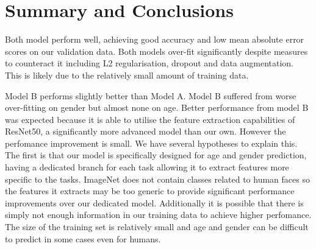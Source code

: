 \section{Summary and Conclusions}
Both model perform well, achieving good accuracy and low mean absolute error scores on our validation data.
Both models over-fit significantly despite measures to counteract it including L2 regularisation,
dropout and data augmentation. This is likely due to the relatively small amount of training data.

Model B performs slightly better than Model A. Model B suffered from worse over-fitting on gender but almost none on age. Better performance from model B was expected because it is able to utilise the feature extraction capabilities of ResNet50, a significantly more advanced model than our own. However the perfomance improvement is small. We have several hypotheses to explain this. The first is that our model is specifically designed for age and gender prediction, having a dedicated branch for each task allowing it to extract features more specific to the tasks. ImageNet does not contain classes related to human faces so the features it extracts may be too generic to provide significant performance improvements over our dedicated model. Additionally it is possible that there is simply not enough information in our training data to achieve higher perfomance. The size of the training set is relatively small and age and gender can be difficult to predict in some cases even for humans.

